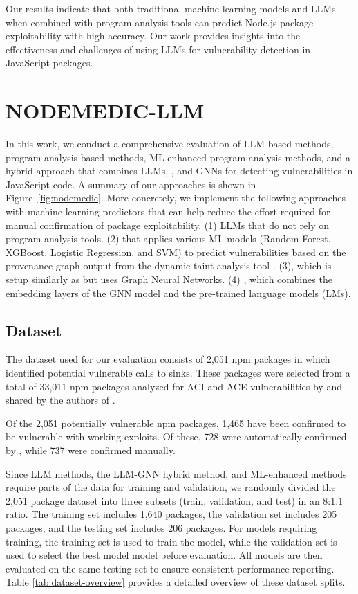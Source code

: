 \documentclass[12pt,openany,oneside,table]{cmuthesis}
\begin{document}
Our results indicate that 
both traditional machine learning models and LLMs when combined with program analysis tools can predict Node.js package exploitability with high accuracy.
Our work provides insights into the effectiveness and challenges of using LLMs for vulnerability detection in JavaScript packages.

\section{NODEMEDIC-LLM}
In this work, we conduct a comprehensive evaluation of LLM-based methods, program analysis-based methods, ML-enhanced program analysis methods, and a hybrid approach that combines LLMs, \nodemedicfine, and GNNs for detecting vulnerabilities in JavaScript code.
A summary of our approaches is shown in Figure~\ref{fig:nodemedic}.
More concretely, we implement the following approaches with machine learning predictors that can help reduce the effort required for manual confirmation of package exploitability. (1) LLMs that do not rely on program analysis tools. (2)  that applies various ML models (Random Forest, XGBoost, Logistic Regression, and SVM) to predict vulnerabilities based on the provenance graph output from the dynamic taint analysis tool \nodemedicfine. 
(3), which is setup similarly as  but uses Graph Neural Networks. 
(4) , which combines the embedding layers of the GNN model and the pre-trained language models (LMs).


\subsection{Dataset}\label{subsec:datasets}
The dataset used for our evaluation consists of 2,051 npm packages in which \nodemedicfine identified potential vulnerable calls to sinks. These packages were selected from a total of 33,011 npm packages analyzed for ACI and ACE vulnerabilities by \nodemedicfine and shared by the authors of \nodemedicfine.

Of the 2,051 potentially vulnerable npm packages, 1,465 have been confirmed to be vulnerable with working exploits. Of these, 728 were automatically confirmed by \nodemedicfine, while 737 were confirmed manually. 

Since LLM methods, the LLM-GNN hybrid method, and ML-enhanced \nodemedicfine methods require parts of the data for training and validation, we randomly divided the 2,051 package dataset into three subsets (train, validation, and test) in an 8:1:1 ratio. The training set includes 1,640 packages, the validation set includes 205 packages, and the testing set includes 206 packages.
For models requiring training, the training set is used to train the model, while the validation set is used to select the best model model before evaluation. All models are then evaluated on the same testing set to ensure consistent performance reporting.
Table \ref{tab:dataset-overview} provides a detailed overview of these dataset splits.
\end{document}
